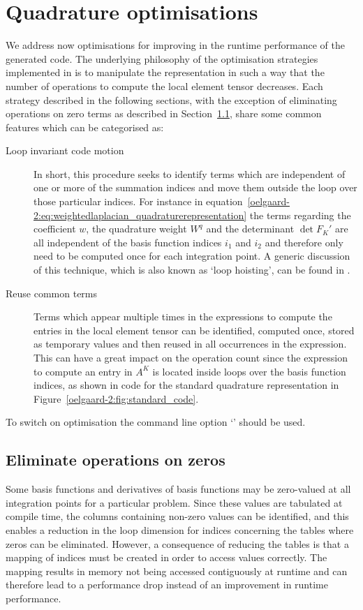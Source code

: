 \section{Quadrature optimisations}
\label{oelgaard-2:sec:quadrature_optimisations}
%
We address now optimisations for improving in the runtime performance of the
generated code.
The underlying philosophy of the optimisation strategies implemented in
\ffc{} is to manipulate the representation in such a way that the number of
operations to compute the local element tensor decreases.
Each strategy described in the following sections, with the exception
of eliminating operations on zero terms as described in
Section~\ref{oelgaard-2:sec:eliminate_zeros},
share some common features which can be categorised as:
%
\begin{description}
  \item[Loop invariant code motion] In short, this procedure seeks to identify
  terms which are independent of one or more of the summation indices and move
  them outside the loop over those particular indices.
  For instance in
  equation~\eqref{oelgaard-2:eq:weightedlaplacian_quadraturerepresentation}
  the terms regarding the coefficient $w$, the quadrature weight $W^q$ and the
  determinant $\det F_K'$ are all independent of the basis function indices
  $i_1$ and $i_2$ and therefore only need to be computed once for each
  integration point.
  A generic discussion of this technique, which is also known as `loop hoisting',
  can be found in \citet{aho_ullman:1986}.
%
  \item[Reuse common terms] Terms which appear multiple times in the expressions
  to compute the entries in the local element tensor can
  be identified, computed once, stored as temporary values and then reused in
  all occurrences in the expression.
  This can have a great impact on the operation count since the expression to
  compute an entry in $A^K$ is located inside loops over the basis function
  indices, as shown in code for the standard quadrature representation in
  Figure~\ref{oelgaard-2:fig:standard_code}.
%
\end{description}
%
To switch on optimisation the command line option `' should be used.
%
\subsection{Eliminate operations on zeros}
\label{oelgaard-2:sec:eliminate_zeros}
%
Some basis functions and derivatives of basis functions may be zero-valued
at all integration points for a particular problem.
Since these values are tabulated at compile time, the columns containing
non-zero values can be identified, and this enables a reduction in the loop
dimension for indices concerning the tables where zeros can be eliminated.
However, a consequence of reducing the tables is that a mapping of indices
must be created in order to access values correctly.
The mapping results in memory not being accessed contiguously at runtime and
can therefore lead to a performance drop instead of an improvement
in runtime performance.

